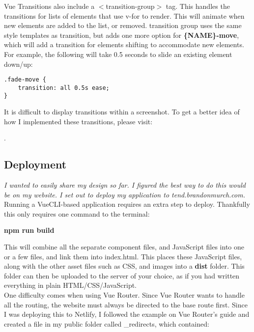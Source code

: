 \documentclass[portfolio.tex]{subfiles}
\begin{document}
			Vue Transitions also include a $<$transition-group$>$ tag. This handles the transitions for lists of elements that use v-for to render. This will animate when new elements are added to the list, or removed. transition group uses the same style templates as transition, but adds one more option for \textbf{\{NAME\}-move}, which will add a transition for elements shifting to accommodate new elements. For example, the following will take 0.5 seconds to slide an existing element down/up:\\

			\begin{lstlisting}
.fade-move {
	transition: all 0.5s ease;
}
			\end{lstlisting}

			\vspace{0.5cm}
			It is difficult to display transitions within a screenshot. To get a better idea of how I implemented these transitions, please visit:
			 \begin{center}
				 \Large{}.
			 \end{center}


		 \subsection{Deployment}
		 	\textit{I wanted to easily share my design so far. I figured the best way to do this would be on my website. I set out to deploy my application to tend.brandonmurch.com. }\\

		 	Running a VueCLI-based application requires an extra step to deploy. Thankfully this only requires one command to the terminal:

		 	\begin{center}
				\textbf{npm run build}
		 	\end{center}

	 		This will combine all the separate component files, and JavaScript files into one or a few  files, and link them into index.html. This places these JavaScript files, along with the other asset files such as CSS, and images into a \textbf{dist} folder. This folder can then be uploaded to the server of your choice, as if you had written everything in plain HTML/CSS/JavaScript.\\

		 	One difficulty comes when using Vue Router. Since Vue Router wants to handle all the routing, the website must always be directed to the base route first. Since I was deploying this to Netlify, I followed the example on Vue Router's guide and created a file in my public folder called \_redirects, which contained:\\
\end{document}
